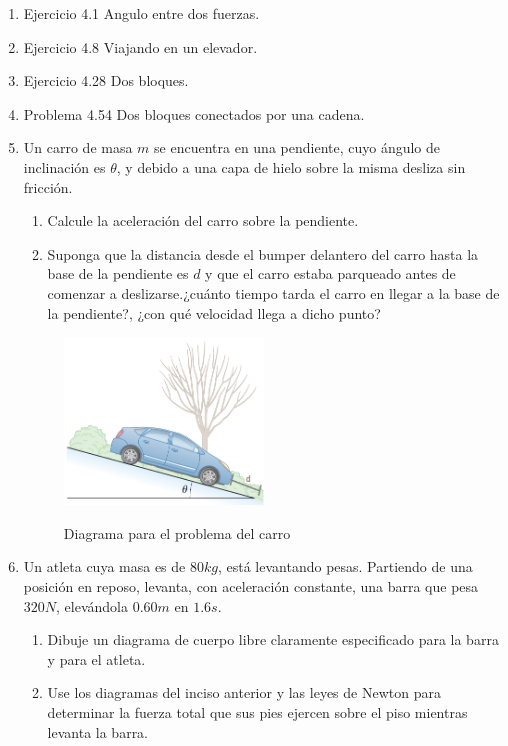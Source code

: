 \documentclass[letterpaper,10pt,onecolumn]{article}
\begin{document}
\begin{enumerate}
\item Ejercicio 4.1 Angulo entre dos fuerzas.
\item Ejercicio 4.8  Viajando en un elevador.
\item Ejercicio 4.28  Dos bloques. %

\item Problema 4.54 Dos bloques conectados por una cadena.

\item Un carro de masa $m$ se encuentra en una pendiente, cuyo ángulo de inclinación es $\theta$, y debido a una capa de hielo sobre la misma desliza sin fricción.
\begin{enumerate}
\item Calcule la aceleración del carro sobre la pendiente.
\item Suponga que la distancia desde el bumper delantero del carro hasta la base de la pendiente es $d$ y que el carro estaba parqueado antes de comenzar a deslizarse.¿cuánto tiempo tarda el carro en llegar a la base de la pendiente?, ¿con qué velocidad llega a dicho punto?
\end{enumerate}
\begin{figure}[hb]
\centering
\includegraphics[width=0.5\textwidth]{carro.png}\\
\caption{Diagrama para el problema del carro}
\end{figure} %

\item
Un atleta cuya masa es de $80kg$, está levantando pesas. Partiendo de una posición en reposo, levanta, con aceleración constante, una barra que pesa $320N$, elevándola $0.60m$ en $1.6s$. 
\begin{enumerate}
\item Dibuje un diagrama de cuerpo libre claramente especificado para la barra y para el atleta. 
\item
Use los diagramas del inciso anterior y las leyes de Newton para determinar la fuerza total que sus pies ejercen sobre el piso mientras levanta la barra.
\end{enumerate}


\end{enumerate}
\end{document}
